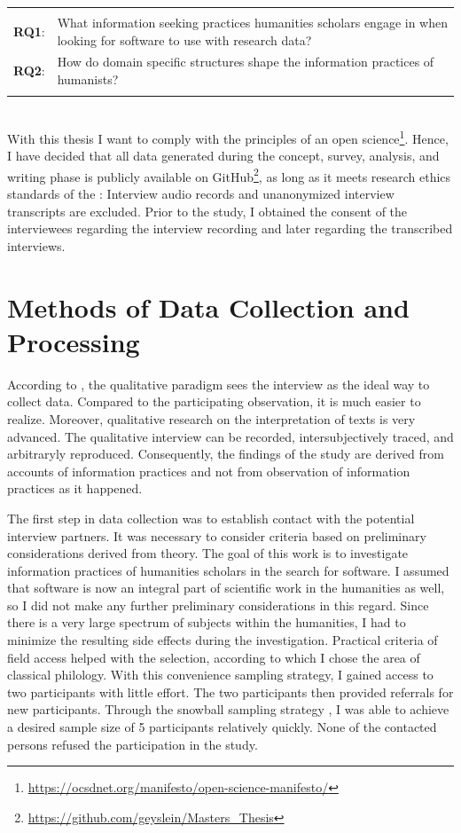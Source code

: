 \documentclass[12pt, a4paper, titlepage, oneside, abstract=true, toc=listof, toc=bibliography]{scrreprt}
\begin{document}
\begin{tabular}{p{2cm}p{12cm}}
& \\
\textbf{RQ1}: & What information seeking practices humanities scholars engage in when looking for software to use with research data? \\ 
\textbf{RQ2}: & How do domain specific structures shape the information practices of humanists? \\ 
& \\
\end{tabular}\\  

With this thesis I want to comply with the principles of an open science\footnote{\url{https://ocsdnet.org/manifesto/open-science-manifesto/}}. Hence, I have decided that all data generated during the concept, survey, analysis, and writing phase is publicly available on GitHub\footnote{\url{https://github.com/geyslein/Masters_Thesis}}, as long as it meets research ethics standards of the \citet{DeutscheForschungsgemeinschaft2019}: Interview audio records and unanonymized interview transcripts are excluded. Prior to the study, I obtained the consent of the interviewees regarding the interview recording and later regarding the transcribed interviews.

\section{Methods of Data Collection and Processing}
\label{sec:data_collection}
According to \citet[p. 329]{Lamnek2005}, the qualitative paradigm sees the interview as the ideal way to collect data. Compared to the participating observation, it is much easier to realize. Moreover, qualitative research on the interpretation of texts is very advanced. The qualitative interview can be recorded, intersubjectively traced, and arbitraryly reproduced. Consequently, the findings of the study are derived from accounts of information practices and not from observation of information practices as it happened. 

The first step in data collection was to establish contact with the potential interview partners. It was necessary to consider criteria based on preliminary considerations derived from theory. The goal of this work is to investigate information practices of humanities scholars in the search for software. I assumed that software is now an integral part of scientific work in the humanities as well, so I did not make any further preliminary considerations in this regard. Since there is a very large spectrum of subjects within the humanities, I had to minimize the resulting side effects during the investigation. Practical criteria of field access helped with the selection, according to which I chose the area of classical philology. With this convenience sampling strategy, I gained access to two participants with little effort. The two participants then provided referrals for new participants. Through the snowball sampling strategy \citep{Biernacki1981}, I was able to achieve a desired sample size of 5 participants relatively quickly. None of the contacted persons refused the participation in the study.
\end{document}
